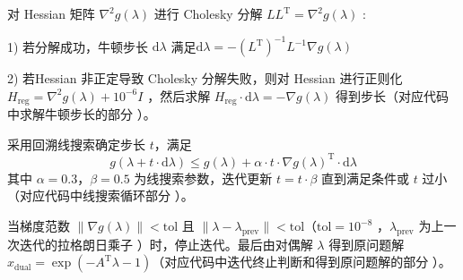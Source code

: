 \documentclass{article}
\newenvironment{solution_cn}{%
  \begin{proof}[解答]%
  \kaishu  %
}{%
  \end{proof}%
}
\begin{document}
\begin{solution_cn}
对 Hessian 矩阵 \( \nabla^2 g(\lambda) \) 进行 Cholesky 分解 \( L L^{\mathrm{T}} = \nabla^2 g(\lambda) \) :

1) 若分解成功，牛顿步长 \( \mathrm{d}\lambda \) 满足$\mathrm{d}\lambda = - (L^{\mathrm{T}})^{-1} L^{-1} \nabla g(\lambda)$

2) 若Hessian 非正定导致 Cholesky 分解失败，则对 Hessian 进行正则化 \( H_{\text{reg}} = \nabla^2 g(\lambda) + 10^{-6} I \) ，然后求解 \( H_{\text{reg}} \cdot \mathrm{d}\lambda = -\nabla g(\lambda) \) 得到步长（对应代码中求解牛顿步长的部分 ）。

采用回溯线搜索确定步长 \( t \)，满足$$
g(\lambda + t \cdot \mathrm{d}\lambda) \leq g(\lambda) + \alpha \cdot t \cdot \nabla g(\lambda)^{\mathrm{T}} \cdot \mathrm{d}\lambda$$
其中 \( \alpha = 0.3 \)，\( \beta = 0.5 \) 为线搜索参数，迭代更新 \( t = t \cdot \beta \) 直到满足条件或 \( t \) 过小（对应代码中线搜索循环部分 ）。

当梯度范数 \( \|\nabla g(\lambda)\| < \text{tol} \) 且 \( \|\lambda - \lambda_{\text{prev}}\| < \text{tol} \)（\( \text{tol} = 10^{-8} \) ，\( \lambda_{\text{prev}} \) 为上一次迭代的拉格朗日乘子 ）时，停止迭代。最后由对偶解 \( \lambda \) 得到原问题解 \( x_{\text{dual}} = \exp(-A^{\mathrm{T}} \lambda - 1) \)（对应代码中迭代终止判断和得到原问题解的部分 ）。


\end{solution_cn}
\end{document}
